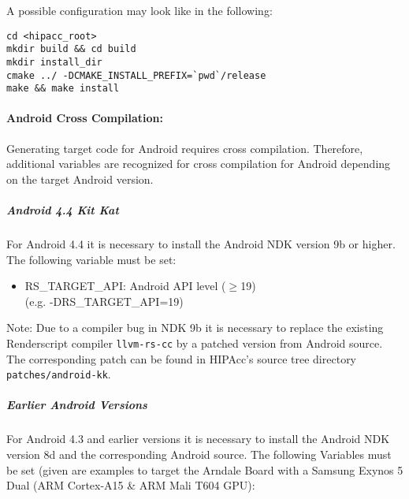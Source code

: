 A possible configuration may look like in the following:
\begin{lstlisting}
cd <hipacc_root>
mkdir build && cd build
mkdir install_dir
cmake ../ -DCMAKE_INSTALL_PREFIX=`pwd`/release
make && make install
\end{lstlisting}


\paragraph{Android Cross Compilation:}
Generating target code for Android requires cross compilation. Therefore,
additional variables are recognized for cross compilation for Android depending
on the target Android version.

\subparagraph{Android 4.4 Kit Kat}
For Android 4.4 it is necessary to install the Android NDK version 9b or higher.
The following variable must be set:

\begin{itemize}
  \item RS\_TARGET\_API:                Android API level ($\ge$19)\\
                                        (e.g. -DRS\_TARGET\_API=19)
\end{itemize}

Note: Due to a compiler bug in NDK 9b it is necessary to replace the existing
Renderscript compiler \texttt{llvm-rs-cc} by a patched version from Android
source. The corresponding patch can be found in \ac{HIPAcc}'s source tree
directory \texttt{patches/android-kk}.

\subparagraph{Earlier Android Versions}
For Android 4.3 and earlier versions it is necessary to install the Android NDK
version 8d and the corresponding Android source. The following Variables must be
set (given are examples to target the Arndale Board with a Samsung Exynos 5 Dual
(ARM Cortex-A15 \& ARM Mali T604 GPU):

